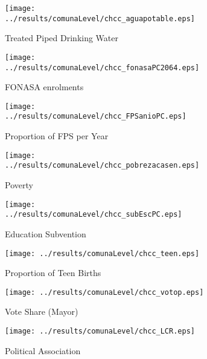 \documentclass[12pt]{article}
\begin{document}
\begin{spacing}{1.4}
\begin{landscape}
\begin{figure}[htpb!]
  \begin{center}
    \caption{Municipal Characteristics and ChCC Enrollment}
    \label{ChCCenrol}
    \begin{subfigure}{.33\textwidth}
      \centering
      \texttt{[image: ../results/comunaLevel/chcc\_aguapotable.eps]}
      \caption{Treated Piped Drinking Water}
      \label{agua}
    \end{subfigure}%
    \begin{subfigure}{.33\textwidth}
      \centering
      \texttt{[image: ../results/comunaLevel/chcc\_fonasaPC2064.eps]}
      \caption{FONASA enrolments}
      \label{fonasa}
    \end{subfigure}%
    \begin{subfigure}{.33\textwidth}
      \centering
      \texttt{[image: ../results/comunaLevel/chcc\_FPSanioPC.eps]}
      \caption{Proportion of FPS per Year}
      \label{FPS}
    \end{subfigure}
    \begin{subfigure}{.33\textwidth}
      \centering
      \texttt{[image: ../results/comunaLevel/chcc\_pobrezacasen.eps]}
      \caption{Poverty}
      \label{pobreza}
    \end{subfigure}%
    \begin{subfigure}{.33\textwidth}
      \centering
      \texttt{[image: ../results/comunaLevel/chcc\_subEscPC.eps]}
      \caption{Education Subvention}
      \label{subEsc}
    \end{subfigure}%
    \begin{subfigure}{.33\textwidth}
      \centering
      \texttt{[image: ../results/comunaLevel/chcc\_teen.eps]}
      \caption{Proportion of Teen Births}
      \label{teen}
    \end{subfigure}
    \begin{subfigure}{.33\textwidth}
      \centering
      \texttt{[image: ../results/comunaLevel/chcc\_votop.eps]}
      \caption{Vote Share (Mayor)}
      \label{votop}
    \end{subfigure}%
    \begin{subfigure}{.33\textwidth}
      \centering
      \texttt{[image: ../results/comunaLevel/chcc\_LCR.eps]}
      \caption{Political Association}
      \label{LCR}
    \end{subfigure}%
    \begin{subfigure}{.33\textwidth}

\end{subfigure}
\end{center}
\end{figure}
\end{landscape}
\end{spacing}
\end{document}
